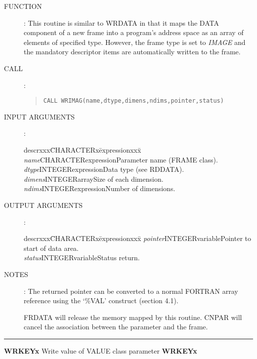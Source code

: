 \documentclass{article}
\begin{document}
\begin{description}
\item [FUNCTION]:
This routine is similar to WRDATA in that it maps the DATA component of a new
frame into a program's address space as an array of elements of specified type.
However, the frame type is set to {\em IMAGE} and the mandatory descriptor items are
automatically written to the frame.
\item [CALL]:
\begin{quote}
{\tt CALL WRIMAG(name,dtype,dimens,ndims,pointer,status)}
\end{quote}
\item [INPUT ARGUMENTS]:
\begin{tabbing}
descrxxx\=CHARACTERx\=expressionxxx\=\kill
{\em name}\>CHARACTER\>expression\>Parameter name (FRAME class).\\
{\em dtype}\>INTEGER\>expression\>Data type (see RDDATA).\\
{\em dimens}\>INTEGER\>array\>Size of each dimension.\\
{\em ndims}\>INTEGER\>expression\>Number of dimensions.
\end{tabbing}
\item [OUTPUT ARGUMENTS]:
\begin{tabbing}
descrxxx\=CHARACTERx\=expressionxxx\=\kill
{\em pointer}\>INTEGER\>variable\>Pointer to start of data area.\\
{\em status}\>INTEGER\>variable\>Status return.
\end{tabbing}
\item [NOTES]:
The returned pointer can be converted to a normal FORTRAN array reference using
the `\%VAL' construct (section 4.1).

FRDATA will release the memory mapped by this routine.
CNPAR will cancel the association between the parameter and the frame.
\end{description}
\rule{\textwidth}{0.3mm}
{\Large {\bf WRKEYx} \hfill Write value of VALUE class parameter \hfill {\bf WRKEYx}}
\end{document}
